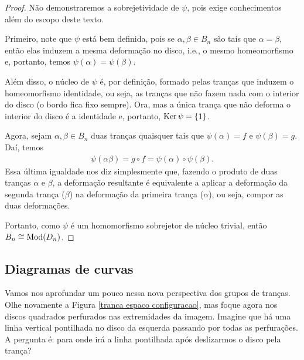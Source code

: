 	\begin{proof}
		Não demonstraremos a sobrejetividade de $\psi$, pois exige conhecimentos além do escopo 
		deste texto.
		
		\par\vspace{0.3cm} Primeiro, note que $\psi$ está bem definida, pois se $\alpha, \beta\in B_n$ 
		são tais que $\alpha = \beta$, então elas induzem a mesma deformação no disco, i.e., 
		o mesmo homeomorfismo e, portanto, temos $\psi(\alpha) = \psi(\beta)$.
		
		\par\vspace{0.3cm} Além disso, o núcleo de $\psi$ é, por definição, formado pelas 
		tranças que induzem o homeomorfismo identidade, ou seja, as tranças que não fazem nada com 
		o interior do disco (o bordo fica fixo sempre). Ora, mas a única trança que não deforma o 
		interior do disco é a identidade e, portanto, $\operatorname{Ker}\psi = \{1\}$.
		
		\par\vspace{0.3cm} Agora, sejam $\alpha, \beta\in B_n$ duas tranças quaisquer tais que 
		$\psi(\alpha) = f$ e $\psi(\beta) = g$. Daí, temos
		\begin{align*}
		    \psi(\alpha\beta) = g\circ f = \psi(\alpha)\circ\psi(\beta).
		\end{align*}
		Essa última igualdade nos diz simplesmente que, fazendo o produto de duas tranças 
		$\alpha$ e $\beta$, a deformação resultante é equivalente a aplicar a deformação 
		da segunda trança ($\beta$) na deformação da primeira trança ($\alpha$), ou seja, 
		compor as duas deformações.
		
		\par\vspace{0.3cm} Portanto, como $\psi$ é um homomorfismo sobrejetor de núcleo 
		trivial, então $B_n\cong\operatorname{Mod}(D_n)$.
	\end{proof}
	\subsection*{Diagramas de curvas}
	Vamos nos aprofundar um pouco nessa nova perspectiva dos grupos de tranças. 
	Olhe novamente a Figura \ref{tranca espaco configuracao}, mas foque agora nos discos quadrados 
	perfurados nas extremidades da imagem. Imagine que há uma linha vertical pontilhada no disco 
	da esquerda passando por todas as perfurações. A pergunta é: para onde irá a linha pontilhada 
	após deslizarmos o disco pela trança?
	
